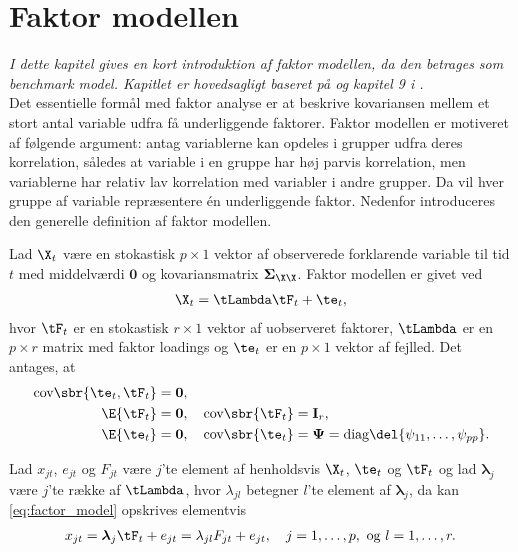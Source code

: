 \chapter{Faktor modellen} \label{ch:dfm}
\textit{I dette kapitel gives en kort introduktion af faktor modellen, da den betrages som benchmark model. Kapitlet er hovedsagligt baseret på \citep{stock_watson_2002a} og kapitel 9 i \citep{faktorbook}.} \\[4mm]
%
Det essentielle formål med faktor analyse er at beskrive kovariansen mellem et stort antal variable udfra få underliggende faktorer.
Faktor modellen er motiveret af følgende argument: antag variablerne kan opdeles i grupper udfra deres korrelation, således at variable i en gruppe har høj parvis korrelation, men variablerne har relativ lav korrelation med variabler i andre grupper.
Da vil hver gruppe af variable repræsentere én underliggende faktor.
Nedenfor introduceres den generelle definition af faktor modellen.
%
\begin{defn} \label{def:faktor_model}
Lad \(\X_t\) være en stokastisk \(p \times 1\) vektor af observerede forklarende variable til tid \(t\) med middelværdi \(\mathbf{0}\) og kovariansmatrix \(\boldsymbol{\Sigma}_{\X \X}\).
Faktor modellen er givet ved
\begin{align}
\X_t = \tLambda \tF_t + \te_t, \label{eq:factor_model}
\end{align}
hvor \(\tF_t\) er en stokastisk \(r \times 1\) vektor af uobserveret faktorer, \(\tLambda\) er en \(p \times r\) matrix med faktor loadings og \(\te_t\) er en \(p \times 1\) vektor af fejlled.
Det antages, at
\begin{align*}
\text{cov} \sbr{\te_t, \tF_t} &= \mathbf{0}, \\
\E{\tF_t} &= \mathbf{0}, \quad \text{cov}\sbr{\tF_t} = \mathbf{I}_r, \\
\E{\te_t} &= \mathbf{0}, \quad \text{cov}\sbr{\te_t} = \boldsymbol{\Psi} = \text{diag} \del{\psi_{11}, \ldots, \psi_{pp}}.
\end{align*}
\end{defn}
%
Lad \(x_{jt}\), \( e_{jt}\) og \(F_{jt}\) være \(j\)'te element af henholdsvis \(\X_t\), \(\te_t\) og \(\tF_t\) og lad \(\boldsymbol{\lambda}_j \) være \(j\)'te række af \(\tLambda\), hvor \(\lambda_{jl}\) betegner \(l\)'te element af \(\boldsymbol{\lambda}_j \), da kan \eqref{eq:factor_model} opskrives elementvis
\begin{align*}
x_{jt} = \boldsymbol{\lambda}_j \tF_t + e_{jt} = \lambda_{jl}F_{jt} + e_{jt}, \quad j = 1, \ldots, p, \text{ og } l = 1, \ldots, r.
\end{align*} 
